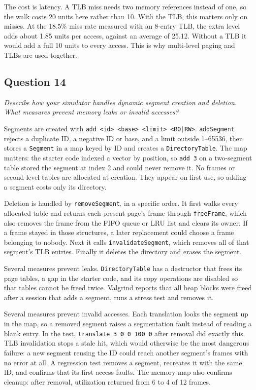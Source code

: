 \documentclass[11pt]{article}
\newcommand{\question}[2]{\subsection*{Question #1}\noindent\textit{#2}\par\medskip}
\newcommand{\code}[1]{\texttt{#1}}
\begin{document}
The cost is latency. A TLB miss needs two memory references instead of one, so the
walk costs 20 units here rather than 10. With the TLB, this matters only on
misses. At the 18.5\% miss rate measured with an 8-entry TLB, the extra level adds
about 1.85 units per access, against an average of 25.12. Without a TLB it would
add a full 10 units to every access. This is why multi-level paging and TLBs are
used together.

\question{14}{Describe how your simulator handles dynamic segment creation and deletion. What measures prevent memory leaks or invalid accesses?}
Segments are created with \code{add <id> <base> <limit> <RO|RW>}. \code{addSegment}
rejects a duplicate ID, a negative ID or base, and a limit outside 1--65536, then
stores a \code{Segment} in a map keyed by ID and creates a \code{DirectoryTable}.
The map matters: the starter code indexed a vector by position, so \code{add 3}
on a two-segment table stored the segment at index 2 and could never remove it.
No frames or second-level tables are allocated at creation. They appear on first
use, so adding a segment costs only its directory.

Deletion is handled by \code{removeSegment}, in a specific order. It first walks
every allocated table and returns each present page's frame through
\code{freeFrame}, which also removes the frame from the FIFO queue or LRU list and
clears its owner. If a frame stayed in those structures, a later replacement could
choose a frame belonging to nobody. Next it calls \code{invalidateSegment}, which
removes all of that segment's TLB entries. Finally it deletes the directory and
erases the segment.

Several measures prevent leaks. \code{DirectoryTable} has a destructor that frees
its page tables, a gap in the starter code, and its copy operations are disabled
so that tables cannot be freed twice. Valgrind reports that all heap blocks were
freed after a session that adds a segment, runs a stress test and removes it.

Several measures prevent invalid accesses. Each translation looks the segment up
in the map, so a removed segment raises a segmentation fault instead of reading a
blank entry. In the test, \code{translate 3 0 0 100 0} after removal did exactly
this. TLB invalidation stops a stale hit, which would otherwise be the most
dangerous failure: a new segment reusing the ID could reach another segment's
frames with no error at all. A regression test removes a segment, recreates it
with the same ID, and confirms that its first access faults. The memory map also
confirms cleanup: after removal, utilization returned from 6 to 4 of 12 frames.
\end{document}
